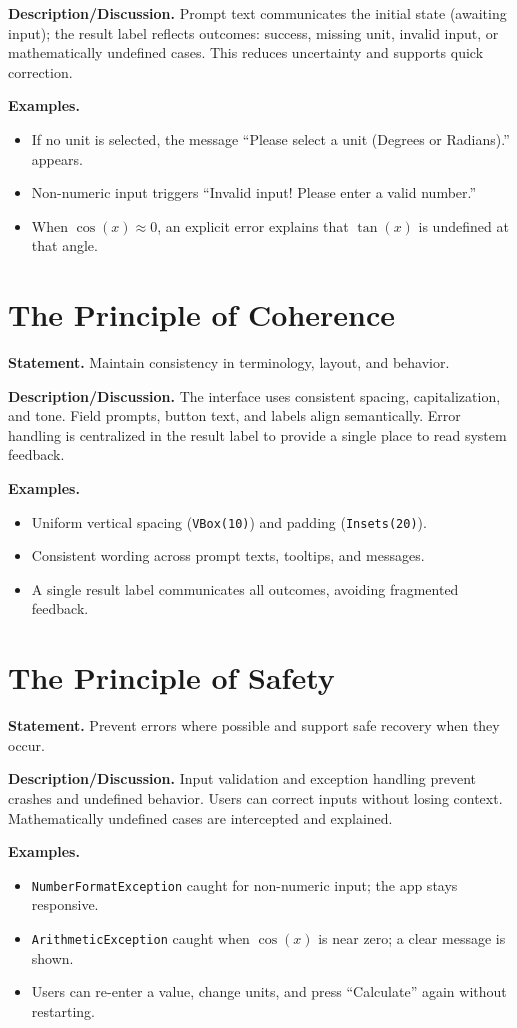\documentclass[11pt]{article}
\begin{document}
    \noindent\textbf{Description/Discussion.}
    Prompt text communicates the initial state (awaiting input); the result label reflects outcomes: success, missing unit, invalid input, or mathematically undefined cases. This reduces uncertainty and supports quick correction.

    \noindent\textbf{Examples.}
    \begin{itemize}
        \item If no unit is selected, the message ``Please select a unit (Degrees or Radians).'' appears.
        \item Non-numeric input triggers ``Invalid input! Please enter a valid number.''
        \item When $\cos(x) \approx 0$, an explicit error explains that $\tan(x)$ is undefined at that angle.
    \end{itemize}

    \section{The Principle of Coherence}
    \noindent\textbf{Statement.}
    Maintain consistency in terminology, layout, and behavior.

    \noindent\textbf{Description/Discussion.}
    The interface uses consistent spacing, capitalization, and tone. Field prompts, button text, and labels align semantically. Error handling is centralized in the result label to provide a single place to read system feedback.

    \noindent\textbf{Examples.}
    \begin{itemize}
        \item Uniform vertical spacing (\verb|VBox(10)|) and padding (\verb|Insets(20)|).
        \item Consistent wording across prompt texts, tooltips, and messages.
        \item A single result label communicates all outcomes, avoiding fragmented feedback.
    \end{itemize}

    \section{The Principle of Safety}
    \noindent\textbf{Statement.}
    Prevent errors where possible and support safe recovery when they occur.

    \noindent\textbf{Description/Discussion.}
    Input validation and exception handling prevent crashes and undefined behavior. Users can correct inputs without losing context. Mathematically undefined cases are intercepted and explained.

    \noindent\textbf{Examples.}
    \begin{itemize}
        \item \verb|NumberFormatException| caught for non-numeric input; the app stays responsive.
        \item \verb|ArithmeticException| caught when $\cos(x)$ is near zero; a clear message is shown.
        \item Users can re-enter a value, change units, and press ``Calculate'' again without restarting.
    \end{itemize}
\end{document}
